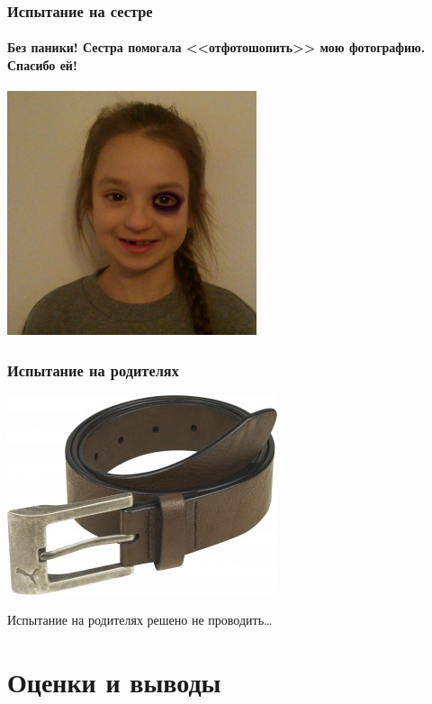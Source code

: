 \begin{frame}
    \frametitle{Испытание на сестре}
    \framesubtitle{Без паники! Сестра помогала <<отфотошопить>> мою фотографию. Спасибо ей!}
    
    \begin{center}
        \includegraphics[width=0.55\textwidth]{fig/nastyaWork}
    \end{center}
\end{frame}

\begin{frame}
    \frametitle{Испытание на родителях}
    
    \begin{center}
        \includegraphics[width=.6\textwidth]{fig/belt}
    \end{center}
    
    Испытание на родителях решено не проводить\ldots
\end{frame}


\section{Оценки и выводы}

